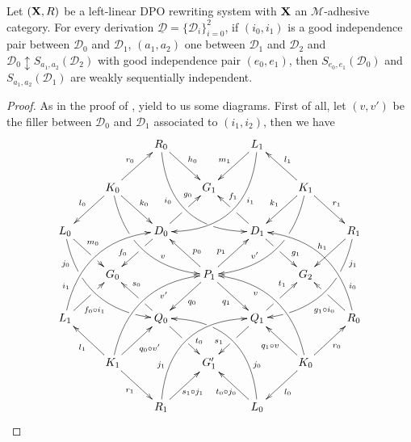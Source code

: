 \documentclass[a4paper,UKenglish,cleveref,pdftex, thm-restate,numberwithinsect]{lipics}
\def\R{\mathsf{R}}
\def\X{\textbf {\textup{X}}}
\newcommand{\dder}[1]{\mathscr{#1}}
\newcommand{\der}[1]{\underline{\dder{#1}}}
\begin{document}
 

\begin{lemma}\label{lem:iig2}Let $(\X,\R)$ be a left-linear DPO rewriting system with $\X$ an $\mathcal{M}$-adhesive category. For every derivation $\der{D}=\{\dder{D}_i\}_{i=0}^2$, if $(i_0,i_1)$ is a good independence pair between $\dder{D}_0$ and $\dder{D}_1$, $(a_1,a_2)$ one between $\dder{D}_1$ and $\dder{D}_2$ and $\dder{D}_0\updownarrow S_{a_1,a_2}(\dder{D}_2)$ with good independence pair $(e_0,e_1)$, then $S_{e_0,e_1}(\dder{D}_0)$ and $S_{a_1,a_2}(\dder{D}_1)$ are weakly sequentially independent.
\end{lemma}
\begin{proof} As in the proof of ,  yield to us some diagrams.  First of all, let $(v,v')$ be the filler between $\dder{D}_0$ and $\dder{D}_1$ associated to $(i_1, i_2)$, then we have
	\[\xymatrix{&&R_0 \ar@/_1cm/[ddrr]_(.35){i_0}|(.7)\hole \ar[dr]^{h_0}&& L_1\ar@/^1cm/[ddll]^(.35){i_1}  \ar[dl]_{m_1}\\&K_0\ar[dr]^{k_0}\ar[dl]_{l_0} \ar@/_.8cm/[ddrr]|(.36)\hole^(.65){v}\ar[ur]^{r_0}&& G_1 && K_1 \ar@/^.8cm/[ddll]|(.36)\hole_(.65){v'}\ar[dl]_{k_1}\ar[lu]_{l_1} \ar[dr]^{r_1}\\L_0 \ar@/_.8cm/[ddrr]_(.2){j_0}|(.31)\hole|(.81)\hole \ar[dr]^(.4){m_0}|(.61)\hole && D_0 \ar[dl]|(.4)\hole_(.65){f_0}\ar[ur]|(.5)\hole^(.7){g_0}&&D_1 \ar[dr]|(.4)\hole^(.65){g_1} \ar[ul]|(.5)\hole_(.65){f_1}&&R_1\ar@/^.8cm/[ddll]^(.2){j_1}|(.31)\hole|(.81)\hole\ar[dl]_{h_1}\\&G_0 &&P_1\ar[dr]_{q_1} \ar[dl]^{q_0}\ar[ur]^(.4){p_1}\ar[ul]_(.4){p_0}&&G_2\\L_1 \ar@/^.8cm/[uurr]^(.2){i_1} \ar[ur]_(.35){f_0\circ i_1}|(.61)\hole&&Q_0 \ar[ul]|(.4)\hole_(.65){s_0}\ar[dr]|(.5)\hole^(.65){t_0} &&Q_1\ar[ur]|(.4)\hole^(.65){t_1} \ar[dl]|(.5)\hole_(.65){s_1} && R_0  \ar[ul]^(.35){g_1\circ i_0}|(.61)\hole\ar@/_.8cm/[uull]_(.2){i_0}\\&K_1 \ar[ur]_{q_0\circ v'} \ar[dr]_{r_1} \ar[ul]^{l_1}\ar@/^.8cm/[uurr]_(.65){v'}&&G'_1&& K_0 \ar[ur]_{r_0} \ar[ul]^{q_1\circ v} \ar[dl]^{l_0} \ar@/_.8cm/[uull]^(.65){v}\\&& R_1 \ar[ur]_{\hspace{-5pt}s_1\circ j_1}\ar@/^1cm/[uurr]^(.25){j_1}&& L_0 \ar[ul]^{t_0\circ j_0\hspace{-5pt}} \ar@/_1cm/[uull]_(.25){j_0} |(.69)\hole }\]
	

\end{proof}
\end{document}
